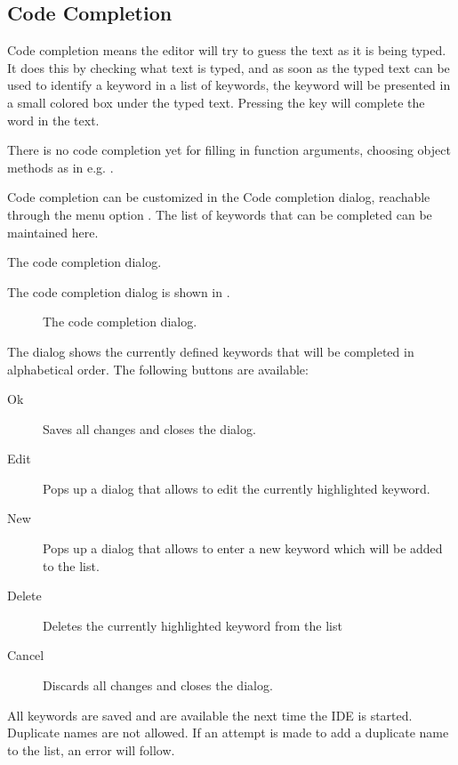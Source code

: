 \subsection{Code Completion}
\label{se:codecompletion}
Code completion means the editor will try to guess the text as it
is being typed. It does this by checking what text is typed, and as soon
as the typed text can be used to identify a keyword in a list of keywords,
the keyword will be presented in a small colored box under the typed text. 
Pressing the  key will complete the word in the text.

There is no code completion yet for filling in function arguments, choosing
object methods as in e.g. \delphi.

Code completion can be customized in the Code completion dialog, reachable 
through the menu option .
The list of keywords that can be completed can be maintained here. 

\begin{htmlonly}
The code completion dialog.
\end{htmlonly}
\begin{latexonly}
The code completion dialog is shown in .
\begin{figure}[ht]
\begin{center}
\caption{The code completion dialog.}\label{fig:codecomp}
\ifpdf
{}
\else
{}
\fi
\end{center}
\end{figure}
\end{latexonly}
The dialog shows the currently defined keywords that will be completed in
alphabetical order.
The following buttons are available:
\begin{description}
\item[Ok] Saves all changes and closes the dialog.
\item[Edit] Pops up a dialog that allows to edit the currently 
highlighted keyword.
\item[New] Pops up a dialog that allows to enter a new keyword which will be
added to the list.
\item[Delete] Deletes the currently highlighted keyword from the list
\item[Cancel] Discards all changes and closes the dialog.
\end{description}
All keywords are saved and are available the next time the IDE is started.
Duplicate names are not allowed. If an attempt is made to add a duplicate
name to the list, an error will follow.


